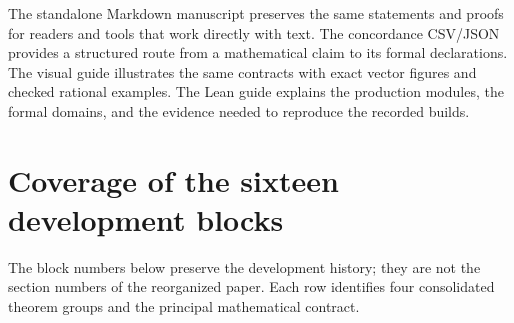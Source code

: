 \documentclass[11pt]{article}
\theoremstyle{definition}\newtheorem{definition}[theorem]{Definition}
\theoremstyle{remark}\newtheorem{remark}[theorem]{Remark}
\begin{document}
The standalone Markdown manuscript preserves the same statements and
proofs for readers and tools that work directly with text. The concordance
CSV/JSON provides a structured route from a mathematical claim to its
formal declarations. The visual guide illustrates the same contracts
with exact vector figures and checked rational examples. The Lean guide
explains the production modules, the formal domains, and the evidence
needed to reproduce the recorded builds.


\appendix
\section{Coverage of the sixteen development blocks}
The block numbers below preserve the development history; they are not
the section numbers of the reorganized paper. Each row identifies four
consolidated theorem groups and the principal mathematical contract.
\end{document}
